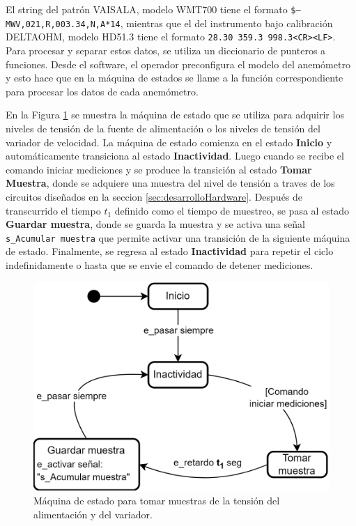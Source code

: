El string del patrón VAISALA, modelo WMT700 tiene el formato \texttt{\$--MWV,021,R,003.34,N,A*14}, mientras que el del instrumento bajo calibración DELTAOHM, modelo HD51.3 tiene el formato \texttt{28.30 359.3 998.3<CR><LF>}. Para procesar y separar estos datos, se utiliza un diccionario de punteros a funciones. Desde el software, el operador preconfigura el modelo del anemómetro y esto hace que en la  máquina de estados se llame a la función correspondiente para procesar los datos de cada anemómetro.

En la Figura \ref{fig:sc_sampleSensorVoltage} se muestra la máquina de estado que se utiliza para adquirir los niveles de tensión de la fuente de alimentación o los niveles de tensión del variador de velocidad. La máquina de estado comienza en el estado \textbf{Inicio} y automáticamente transiciona al estado \textbf{Inactividad}. Luego cuando se recibe el comando iniciar mediciones y se produce la transición al estado \textbf{Tomar Muestra}, donde se adquiere una muestra del nivel de tensión a traves de los circuitos diseñados en la seccion \ref{sec:desarrolloHardware}. Después de transcurrido el tiempo $t_{1}$ definido como el tiempo de muestreo, se pasa al estado \textbf{Guardar muestra}, donde se guarda la muestra  y se activa una señal \texttt{s\_Acumular muestra} que permite activar una transición de la siguiente máquina de estado. Finalmente, se regresa al estado \textbf{Inactividad} para repetir el ciclo indefinidamente o hasta que se envie el comando de detener mediciones.

\begin{figure}[H]
    \centering
    \includegraphics[width=0.6\linewidth]{Figuras/datalogger/Firmware/sc_sampleSensorVoltage.png}
    \caption{Máquina de estado para tomar muestras de la tensión del alimentación y del variador.}
    \label{fig:sc_sampleSensorVoltage}
\end{figure}


